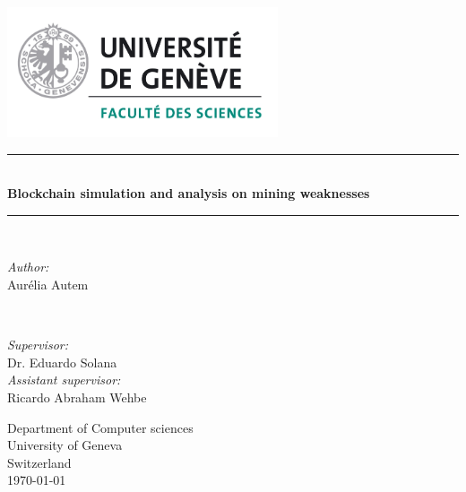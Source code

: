 \begin{titlepage}

		\newcommand{\HRule}{\rule{\linewidth}{0.5mm}}

    \begin{center}
        \vspace*{1cm}

				\includegraphics[width=0.6\textwidth]{Figures/unigeLogo.jpg}
				\vspace{2cm}


				\HRule \\[0.4cm]
        \huge
        \textbf{Blockchain simulation and analysis on mining weaknesses}\\[0.4cm]
				\HRule \\[0.4cm]
        \vspace{2cm}


				\begin{minipage}{0.4\textwidth}
					\begin{flushleft} \Large
						\emph{Author:}\\
						 Aurélia Autem
					\end{flushleft}
				\end{minipage}
				~
				\begin{minipage}{0.4\textwidth}
					\begin{flushright} \Large
						\emph{Supervisor:} \\
						Dr. Eduardo Solana \\
						\vspace{0.5cm}
						\emph{Assistant supervisor:} \\
						Ricardo Abraham Wehbe
					\end{flushright}
				\end{minipage}

				\vfill

        \Large
        Department of Computer sciences\\
        University of Geneva\\
        Switzerland\\
        \today

    \end{center}
\end{titlepage}
